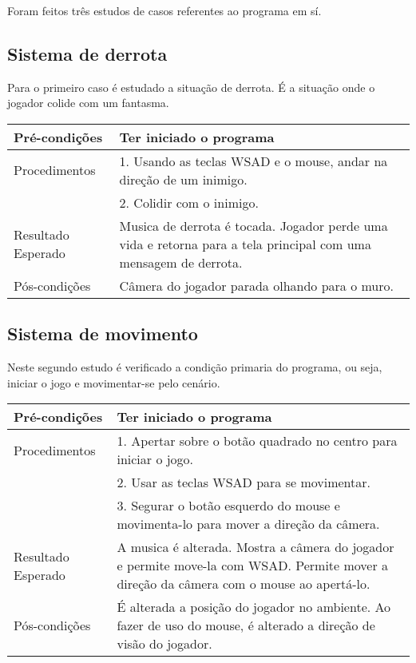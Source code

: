 




Foram feitos três estudos de casos referentes ao programa em sí.

\subsection{Sistema de derrota}\label{label}

Para o primeiro caso é estudado a situação de derrota. É a situação onde o jogador colide com um fantasma.\\

\setlength{\extrarowheight}{1.5pt}
\begin{tabularx}{0.45\textwidth}{lX}
\hline
Pré-condições  & Ter iniciado o programa
\tabularnewline
\hline
Procedimentos 
& 1. Usando as teclas WSAD e o mouse, andar na direção de um inimigo.\tabularnewline
& 2. Colidir com o inimigo.
\tabularnewline\hline
Resultado Esperado & Musica de derrota é tocada. Jogador perde uma vida e retorna para a tela principal com uma mensagem de derrota.
\tabularnewline\hline
Pós-condições & Câmera do jogador parada olhando para o muro.
\end{tabularx}

\subsection{Sistema de movimento}\label{mov}

Neste segundo estudo é verificado a condição primaria do programa, ou seja, iniciar o jogo e movimentar-se pelo cenário.\\

\setlength{\extrarowheight}{1.5pt}
\begin{tabularx}{0.45\textwidth}{lX}
\hline
Pré-condições  & Ter iniciado o programa
\tabularnewline
\hline
Procedimentos
& 1. Apertar sobre o botão quadrado no centro para iniciar o jogo.\tabularnewline 
& 2. Usar as teclas WSAD para se movimentar.\tabularnewline
& 3. Segurar o botão esquerdo do mouse e movimenta-lo para mover a direção da câmera.
\tabularnewline\hline
Resultado Esperado 
& A musica é alterada. Mostra a câmera do jogador e permite move-la com WSAD.  Permite mover a direção da câmera com o  mouse ao apertá-lo. 
\tabularnewline\hline
Pós-condições & É alterada a posição do jogador no ambiente. Ao fazer de uso do mouse, é alterado a direção de visão do jogador.
\end{tabularx}

